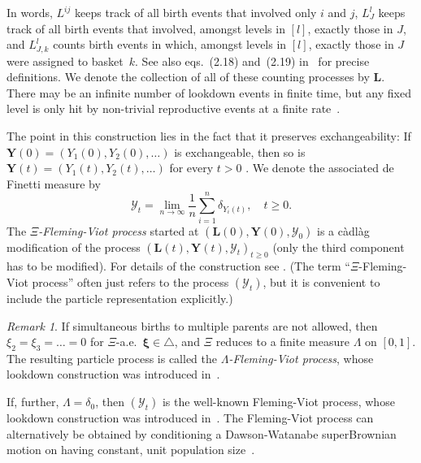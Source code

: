 \documentclass[reqno,draft]{amsart}
\numberwithin{equation}{section}
\theoremstyle{plain}
\theoremstyle{remark}
\newtheorem{remark}[theorem]{Remark}
\newcommand{\R}{\mathbb{R}} %
\newcommand*\diff{\mathop{}\!\mathrm{d}}
\begin{document}
In words, $L^{ij}$ keeps track of all birth events that involved only $i$ and $j$, $L^l_J$ keeps track of all birth events that involved, amongst levels in $[l]$, exactly those in $J$, and $L^l_{J,k}$ counts birth events in which, amongst levels in $[l]$, exactly those in $J$ were assigned to basket~$k$. See also eqs.~(2.18) and~(2.19) in~\cite{xiflemingviot} for precise definitions. We denote the collection of all of these counting processes by $\boldsymbol L$.
There may be an infinite number of lookdown events in finite time, but %
any fixed level is only hit by non-trivial reproductive events at a finite rate~\cite{xiflemingviot}.

The point in this construction lies in the fact that it preserves exchangeability: If $\boldsymbol Y(0) = (Y_1(0),Y_2(0),\ldots )$ is exchangeable, then so is $\boldsymbol Y(t) = (Y_1(t),Y_2(t),\ldots )$ for every $t > 0$ \cite{DK99,xiflemingviot}. We denote the associated de Finetti measure by \[
    \mathcal{Y}_t = \lim_{n\to \infty} \frac{1}{n}\sum_{i=1}^n \delta_{Y_i(t)},\quad t \ge 0.
\] The \emph{$\Xi$-Fleming-Viot process} started at $(\boldsymbol L(0), \boldsymbol Y(0),\mathcal{Y}_0)$ is a c\`adl\`ag modification of the process $(\boldsymbol L(t), \boldsymbol Y(t),\mathcal{Y}_t)_{t \ge 0}$ (only the third component has to be modified). For details of the construction see \cite{xiflemingviot}. (The term ``$\Xi$-Fleming-Viot process'' often just refers to the process $(\mathcal{Y}_t)$, but it is convenient to include the particle representation explicitly.)

\begin{remark}\label{rem:lambdafv}
    If simultaneous births to multiple parents are not allowed, then $\xi_2 = \xi_3 = \ldots = 0$ for $\Xi$-a.e.\ $\boldsymbol \xi \in \triangle$, and $\Xi$ reduces to a finite measure $\Lambda$ on $[0,1]$. %
    The resulting particle process is called the \emph{$\Lambda$-Fleming-Viot process}, whose lookdown construction was introduced in~\cite{DK99}.

    If, further, $\Lambda = \delta_0$, then $(\mathcal{Y}_t)$ is the well-known Fleming-Viot process, whose lookdown construction was introduced in~\cite{DK96}. The Fleming-Viot process can alternatively be obtained by conditioning a Dawson-Watanabe superBrownian motion on having constant, unit population size~\cite{Etheridge91,Perkins91}.
\end{remark}
\end{document}
